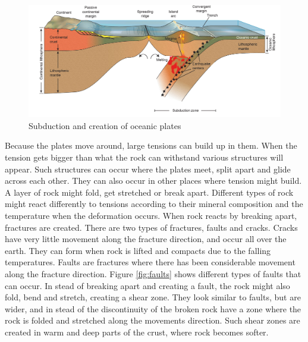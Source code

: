 \documentclass[a4paper,12pt]{report}
\begin{document}
\begin{figure}
 \includegraphics[width=\linewidth]{thesis/geo/english/subduksjon.jpg}
 \caption{Subduction and creation of oceanic plates}
 \label{fig:fig99subduction}
\end{figure}

Because the plates move around, large tensions can build up in them. When the tension gets bigger than what the rock can withstand various structures will appear. Such structures can occur where the plates meet, split apart and glide across each other. They can also occur in other places where tension might build. A layer of rock might fold, get stretched or break apart. Different types of rock might react differently to tensions according to their mineral composition and the temperature when the deformation occurs. When rock reacts by breaking apart, fractures are created. There are two types of fractures, faults and cracks. Cracks have very little movement along the fracture direction, and occur all over the earth. They can form when rock is lifted and compacts due to the falling temperatures. Faults are fractures where there has been considerable movement along the fracture direction. Figure \ref{fig:faults} shows different types of faults that can occur. In stead of breaking apart and creating a fault, 
the rock might also fold, bend and stretch, creating a shear zone. They look similar to faults, but are wider, and in stead of the discontinuity of the broken rock have a zone where the rock is folded and stretched along the movements direction. Such shear zones are created in warm and deep parts of the crust, where rock becomes softer.
\end{document}
